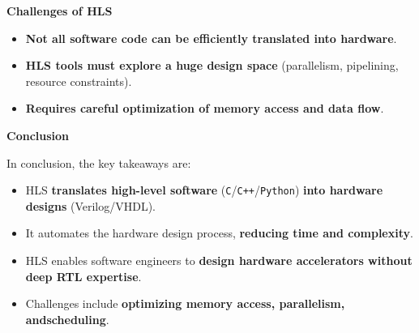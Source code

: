 \highspace
\begin{flushleft}
    \textcolor{Red2}{ \textbf{Challenges of HLS}}
\end{flushleft}
\begin{itemize}
    \item \textbf{Not all software code can be efficiently translated into hardware}.
    \item \textbf{HLS tools must explore a huge design space} (parallelism, pipelining, resource constraints).
    \item \textbf{Requires careful optimization of memory access and data flow}.
\end{itemize}

\highspace
\begin{flushleft}
    \textcolor{Green3}{ \textbf{Conclusion}}
\end{flushleft}
In conclusion, the key takeaways are:
\begin{itemize}
    \item HLS \textbf{translates high-level software} (\texttt{C}/\texttt{C++}/\texttt{Python}) \textbf{into hardware designs} (Verilog/VHDL).
    \item It automates the hardware design process, \textbf{reducing time and complexity}.
    \item HLS enables software engineers to \textbf{design hardware accelerators without deep RTL expertise}.
    \item Challenges include \textbf{optimizing memory access, parallelism, and\break scheduling}.
\end{itemize}